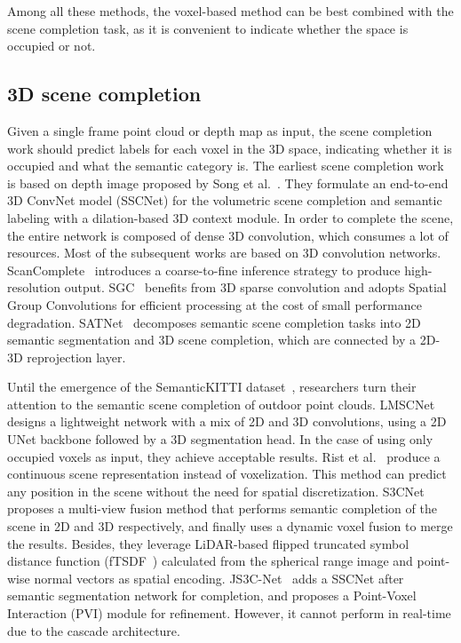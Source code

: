 \documentclass[letterpaper, 10 pt, conference]{ieeeconf}
\begin{document}
Among all these methods, the voxel-based method can be best combined with the scene completion task, as it is convenient to indicate whether the space is occupied or not.

\subsection{3D scene completion}

Given a single frame point cloud or depth map as input, the scene completion work should predict  labels for each voxel in the 3D space, indicating whether it is occupied and what the semantic category is. The earliest scene completion work is based on depth image proposed by Song et al.~\cite{song2017semantic}. They formulate an end-to-end 3D ConvNet model (SSCNet) for the volumetric scene completion and semantic labeling with a dilation-based 3D context module. In order to complete the scene, the entire network is composed of dense 3D convolution, which consumes a lot of resources. 
Most of the subsequent works are based on 3D convolution networks. 
ScanComplete~\cite{dai2018scancomplete} introduces a coarse-to-fine inference strategy to produce high-resolution output. SGC~\cite{zhang2018efficient} benefits from 3D sparse convolution and adopts Spatial Group Convolutions for efficient processing at the cost of small performance degradation. SATNet~\cite{liu2018see} decomposes semantic scene completion tasks into 2D semantic segmentation and 3D scene completion, which are connected by a 2D-3D reprojection layer. 

Until the emergence of the SemanticKITTI dataset~\cite{behley2019semantickitti}, researchers turn their attention to the semantic scene completion of outdoor point clouds. LMSCNet~\cite{roldao2020lmscnet} designs a lightweight network with a mix of 2D and 3D convolutions, using a 2D UNet backbone followed by a 3D segmentation head. In the case of using only occupied voxels as input, they achieve acceptable results. Rist et al.~\cite{rist2020semantic} produce a continuous scene representation instead of voxelization. This method can predict any position in the scene without the need for spatial discretization. S3CNet~\cite{cheng2020s3cnet} proposes a multi-view fusion method that performs semantic completion of the scene in 2D and 3D respectively, and finally uses a dynamic voxel fusion to merge the results. Besides, they leverage LiDAR-based flipped truncated symbol distance function (fTSDF~\cite{song2017semantic}) calculated from the spherical range image and point-wise normal vectors as spatial encoding. JS3C-Net~\cite{yan2020sparse} adds a SSCNet after semantic segmentation network for completion, and proposes a Point-Voxel Interaction (PVI) module for refinement. However, it cannot perform in real-time due to the cascade architecture.
\end{document}
